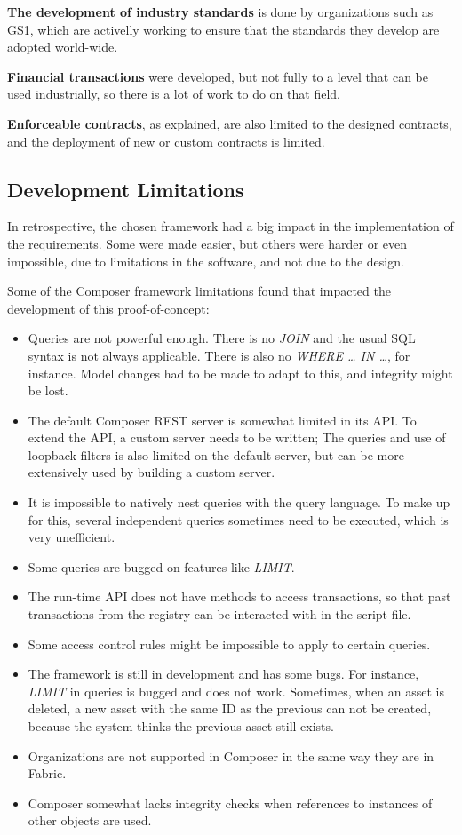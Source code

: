 \textbf{The development of industry standards} is done by organizations such as GS1, which are activelly working to ensure that the standards they develop are adopted world-wide.

\textbf{Financial transactions} were developed, but not fully to a level that can be used industrially, so there is a lot of work to do on that field.

\textbf{Enforceable contracts}, as explained, are also limited to the designed contracts, and the deployment of new or custom contracts is limited.


\subsection{Development Limitations}

In retrospective, the chosen framework had a big impact in the implementation of the requirements. Some were made easier, but others were harder or even impossible, due to limitations in the software, and not due to the design.

Some of the Composer framework limitations found that impacted the development of this proof-of-concept:
\begin{itemize}
	\item  Queries are not powerful enough. There is no \textit{JOIN} and the usual SQL syntax is not always applicable. There is also no \textit{WHERE … IN …}, for instance. Model changes had to be made to adapt to this, and integrity might be lost.
	\item The default Composer REST server is somewhat limited in its API. To extend the API, a custom server needs to be written; The queries and use of loopback filters is also limited on the default server, but can be more extensively used by building a custom server.
	\item It is impossible to natively nest queries with the query language. To make up for this, several independent queries sometimes need to be executed, which is very unefficient.
	\item Some queries are bugged on features like \textit{LIMIT}.
	\item The run-time API does not have methods to access transactions, so that past transactions from the registry can be interacted with in the script file.
	\item Some access control rules might be impossible to apply to certain queries. 
	\item The framework is still in development and has some bugs. For instance, \textit{LIMIT} in queries is bugged and does not work. Sometimes, when an asset is deleted, a new asset with the same ID as the previous can not be created, because the system thinks the previous asset still exists.
	\item Organizations are not supported in Composer in the same way they are in Fabric.
	\item Composer somewhat lacks integrity checks when references to instances of other objects are used.
\end{itemize}

